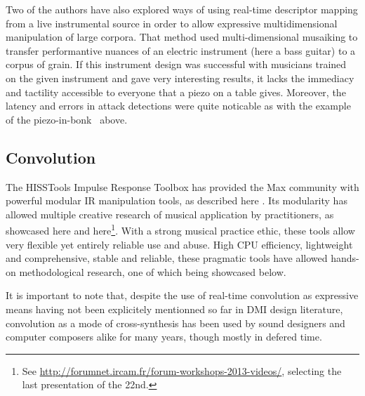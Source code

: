 
Two of the authors have also explored ways of using real-time descriptor mapping from a live instrumental source in order to allow expressive multidimensional manipulation of large corpora\cite{SURFING}. That method used multi-dimensional musaiking to transfer performantive nuances of an electric instrument (here a bass guitar) to a corpus of grain. If this instrument design was successful with musicians trained on the given instrument and gave very interesting results, it lacks the immediacy and tactility accessible to everyone that a piezo on a table gives. Moreover, the latency and errors in attack detections were quite noticable as with the example of the piezo-in-bonk~ above.


\subsection{Convolution}

The HISSTools Impulse Response Toolbox has provided the Max community with powerful modular IR manipulation tools, as described here \cite{HarkerTremblay-icmc2012-hisstools}. Its modularity has allowed multiple creative research of musical application by practitioners, as showcased here \cite{HarkerTremblay-forum2013-rethinking-the-box} and here\footnote{See \url{http://forumnet.ircam.fr/forum-workshops-2013-videos/}, selecting the last presentation of the 22nd.}. With a strong musical practice ethic, these tools allow very flexible yet entirely reliable use and abuse. High CPU efficiency, lightweight and comprehensive, stable and reliable, these pragmatic tools have allowed hands-on methodological research, one of which being showcased below.

It is important to note that, despite the use of real-time convolution as expressive means having not been explicitely mentionned so far in DMI design literature, convolution as a mode of cross-synthesis has been used by sound designers and computer composers alike for many years, though mostly in defered time.